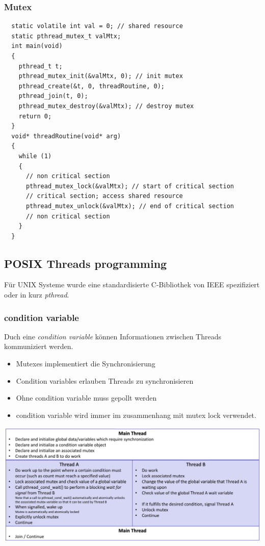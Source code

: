\subsubsection{Mutex}
\begin{lstlisting}
  static volatile int val = 0; // shared resource
  static pthread_mutex_t valMtx;
  int main(void)
  {
    pthread_t t;
    pthread_mutex_init(&valMtx, 0); // init mutex
    pthread_create(&t, 0, threadRoutine, 0);
    pthread_join(t, 0);
    pthread_mutex_destroy(&valMtx); // destroy mutex
    return 0;
  }
  void* threadRoutine(void* arg)
  {
    while (1)
    {
      // non critical section
      pthread_mutex_lock(&valMtx); // start of critical section
      // critical section; access shared resource
      pthread_mutex_unlock(&valMtx); // end of critical section
      // non critical section
    }
  }
\end{lstlisting}

\subsection{POSIX Threads programming}
Für UNIX Systeme wurde eine standardisierte C-Bibliothek von IEEE spezifiziert oder in kurz \textit{pthread}. 

\subsubsection{condition variable}
Duch eine \textit{condition variable} können Informationen zwischen Threads kommuniziert werden.
\begin{itemize}
  \item Mutexes implementiert die Synchronisierung
  \item Condition variables erlauben Threads zu synchronisieren
  \item Ohne condition variable muss gepollt werden
  \item condition variable wird immer im zusammenhang mit mutex lock verwendet.
\end{itemize}
\begin{centering}
  \includegraphics[width=1\textwidth]{images/Concurrency/conditionVariablesAblauf.png}
\end{centering}

